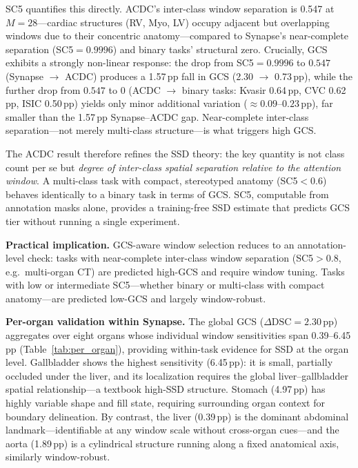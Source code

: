 SC5 quantifies this directly. ACDC's inter-class window separation is 0.547 at $M{=}28$---cardiac structures (RV, Myo, LV) occupy adjacent but overlapping windows due to their concentric anatomy---compared to Synapse's near-complete separation (SC5${=}0.9996$) and binary tasks' structural zero. Crucially, GCS exhibits a strongly non-linear response: the drop from SC5${=}0.9996$ to $0.547$ (Synapse $\to$ ACDC) produces a 1.57\,pp fall in GCS (2.30 $\to$ 0.73\,pp), while the further drop from $0.547$ to $0$ (ACDC $\to$ binary tasks: Kvasir 0.64\,pp, CVC 0.62\,pp, ISIC 0.50\,pp) yields only minor additional variation (${\approx}0.09$--$0.23$\,pp), far smaller than the 1.57\,pp Synapse--ACDC gap. Near-complete inter-class separation---not merely multi-class structure---is what triggers high GCS.

The ACDC result therefore refines the SSD theory: the key quantity is not class count per se but \emph{degree of inter-class spatial separation relative to the attention window}. A multi-class task with compact, stereotyped anatomy (SC5${<}0.6$) behaves identically to a binary task in terms of GCS. SC5, computable from annotation masks alone, provides a training-free SSD estimate that predicts GCS tier without running a single experiment.

\textbf{Practical implication.} GCS-aware window selection reduces to an annotation-level check: tasks with near-complete inter-class window separation (SC5${>}0.8$, e.g.\ multi-organ CT) are predicted high-GCS and require window tuning. Tasks with low or intermediate SC5---whether binary or multi-class with compact anatomy---are predicted low-GCS and largely window-robust.

\textbf{Per-organ validation within Synapse.} The global GCS ($\Delta\text{DSC}{=}2.30$\,pp) aggregates over eight organs whose individual window sensitivities span 0.39--6.45\,pp (Table~\ref{tab:per_organ}), providing within-task evidence for SSD at the organ level. Gallbladder shows the highest sensitivity (6.45\,pp): it is small, partially occluded under the liver, and its localization requires the global liver--gallbladder spatial relationship---a textbook high-SSD structure. Stomach (4.97\,pp) has highly variable shape and fill state, requiring surrounding organ context for boundary delineation. By contrast, the liver (0.39\,pp) is the dominant abdominal landmark---identifiable at any window scale without cross-organ cues---and the aorta (1.89\,pp) is a cylindrical structure running along a fixed anatomical axis, similarly window-robust.

